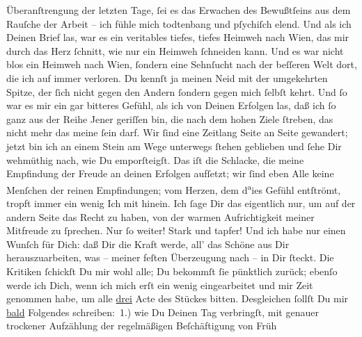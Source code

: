 \begin{ledgroupsized}[t]{13cm}
               Überanſtrengung der letzten Tage, ſei es das Erwachen des Bewußtſeins aus dem Rauſche
               der Arbeit – ich fühle mich todtenbang und pſychiſch elend. Und als ich Deinen Brief
               las, war es ein veritables tiefes, tiefes Heimweh nach Wien, das mir durch das Herz ſchnitt, {\pb}wie
               nur ein Heimweh ſchneiden kann. Und es war nicht blos ein Heimweh nach Wien, ſondern eine Sehnſucht nach der beſſeren Welt
               dort, die ich auf immer verloren. Du kennſt ja meinen Neid mit der umgekehrten
               Spitze, der ſich nicht gegen den Andern ſondern gegen mich ſelbſt kehrt. Und ſo war
               es mir ein gar bitteres Gefühl, als ich von Deinen Erfolgen las, daß ich ſo ganz aus
               der Reihe Jener geriſſen bin, die nach dem hohen Ziele ſtreben, das nicht mehr das
                   meine ſein darf. Wir ſind eine Zeitlang Seite an Seite gewandert; jetzt bin
               ich an einem Stein am Wege unterwegs ſtehen geblieben und ſehe Dir wehmüthig nach,
               wie Du emporſteigſt. Das iſt die Schlacke, die meine Empfindung der Freude an deinen
               Erfolgen aufſetzt; wir ſind eben Alle keine Menſchen der reinen Empfindungen; vom
               Herzen, dem d\substVorne{}\textsuperscript{a}\substDazwischen{}ie\substHinten{}s Gefühl entſtrömt, tropft immer ein wenig Ich mit hinein. Ich ſage Dir das
               eigentlich nur, um auf der andern Seite das Recht zu haben, von der warmen
               Aufrichtigkeit meiner Mitfreude zu ſprechen. Nur ſo weiter! Stark und tapfer! Und ich
               habe nur einen Wunſch für Dich: daß \strikeout{\textcolor{gray}{al}} Dir  die Kraft werde, all’ das Schöne
               aus Dir herauszuarbeiten, was – meiner feſten Überzeugung nach – in Dir ſteckt. Die
               Kritiken ſchickſt Du mir wohl alle; Du bekommſt ſie pünktlich zurück; ebenſo werde
               ich Dich, wenn ich mich erſt ein wenig eingearbeitet und mir Zeit genommen habe, um
               alle \uline{drei} Acte des Stückes{\pb}
               bitten. Desgleichen ſollſt Du mir \uline{bald}{ }Folgendes schreiben: 1.) wie Du Deinen Tag
               verbringſt, mit genauer trockener Aufzählung der regelmäßigen Beſchäftigung von Früh

\end{ledgroupsized}
